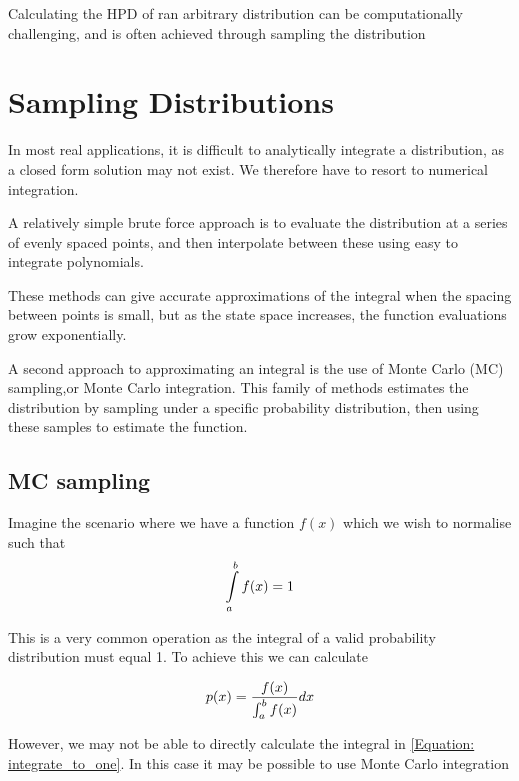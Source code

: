Calculating the HPD of ran arbitrary distribution can be computationally challenging, and is often achieved through sampling the distribution



\section{Sampling Distributions}

In most real applications, it is difficult to analytically integrate a distribution, as a closed form solution may not exist. We therefore have to resort to numerical integration. 

A relatively simple brute force approach is to evaluate the distribution at a series of evenly spaced points, and then interpolate between these using easy to integrate polynomials. 

These methods can give accurate approximations of the integral when the spacing between points is small, but as the state space increases, the function evaluations grow exponentially.

A second approach to approximating an integral is the use of Monte Carlo (MC) sampling,or Monte Carlo integration. This family of methods estimates the distribution by sampling under a specific probability distribution, then using these samples to estimate the function. 



\subsection{MC sampling}


Imagine the scenario where we have a function $f(x)$ which we wish to normalise such that 
\begin{equation}\label{Equation: integrate_to_one} 
\int\limits_a^b{f(x)}=1 
\end{equation}

This is a very common operation as the integral of a valid probability distribution must equal 1. To achieve this we can calculate 

\begin{equation}\label{Equation: divide_by_integral} 
p(x)=\dfrac{f(x) } {\int _{a}^{b}f(x)} dx
\end{equation}

However, we may not be able to directly calculate the integral in \eqref{Equation: integrate_to_one}. In this case it may be possible to use Monte Carlo integration

